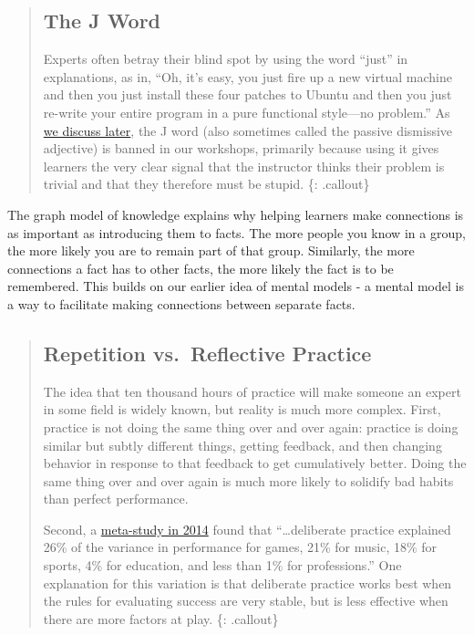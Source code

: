 \begin{quote}
\subsection{The J Word}\label{the-j-word}

Experts often betray their blind spot by using the word ``just'' in
explanations, as in, ``Oh, it's easy, you just fire up a new virtual
machine and then you just install these four patches to Ubuntu and then
you just re-write your entire program in a pure functional style---no
problem.'' As \href{\{\{\%20page.root\%20\}\}/19-motivation/}{we discuss
later}, the J word (also sometimes called the passive dismissive
adjective) is banned in our workshops, primarily because using it gives
learners the very clear signal that the instructor thinks their problem
is trivial and that they therefore must be stupid. \{: .callout\}
\end{quote}

The graph model of knowledge explains why helping learners make
connections is as important as introducing them to facts. The more
people you know in a group, the more likely you are to remain part of
that group. Similarly, the more connections a fact has to other facts,
the more likely the fact is to be remembered. This builds on our earlier
idea of mental models - a mental model is a way to facilitate making
connections between separate facts.

\begin{quote}
\subsection{Repetition vs.~Reflective
Practice}\label{repetition-vs.reflective-practice}

The idea that ten thousand hours of practice will make someone an expert
in some field is widely known, but reality is much more complex. First,
practice is not doing the same thing over and over again: practice is
doing similar but subtly different things, getting feedback, and then
changing behavior in response to that feedback to get cumulatively
better. Doing the same thing over and over again is much more likely to
solidify bad habits than perfect performance.

Second, a \href{http://pss.sagepub.com/content/25/8/1608}{meta-study in
2014} found that ``\ldots{}deliberate practice explained 26\% of the
variance in performance for games, 21\% for music, 18\% for sports, 4\%
for education, and less than 1\% for professions.'' One explanation for
this variation is that deliberate practice works best when the rules for
evaluating success are very stable, but is less effective when there are
more factors at play. \{: .callout\}
\end{quote}

